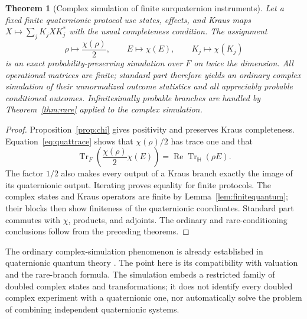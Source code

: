 \documentclass[11pt,oneside]{article}
\numberwithin{equation}{section}
\theoremstyle{plain}
\newtheorem{theorem}{Theorem}[section]
\theoremstyle{definition}
\theoremstyle{remark}
\newcommand{\HH}{\mathbb H}
\newcommand{\Tr}{\operatorname{Tr}}
\newcommand{\Rea}{\operatorname{Re}}
\begin{document}
\begin{theorem}[Complex simulation of finite surquaternion instruments]\label{thm:quatsimulation}
Let a fixed finite quaternionic protocol use states, effects, and Kraus maps
$X\mapsto\sum_jK_jXK_j^*$ with the usual completeness condition. The assignment
\begin{equation}\label{eq:quatsim}
 \rho\longmapsto\frac{\chi(\rho)}2,
 \qquad E\longmapsto\chi(E),
 \qquad K_j\longmapsto\chi(K_j)
\end{equation}
is an exact probability-preserving simulation over $F$ on twice the dimension. All operational matrices are finite; standard part therefore yields an ordinary complex simulation of their unnormalized outcome statistics and all appreciably probable conditioned outcomes. Infinitesimally probable branches are handled by Theorem~\ref{thm:rare} applied to the complex simulation.
\end{theorem}
\begin{proof}
Proposition~\ref{prop:chi} gives positivity and preserves Kraus completeness. Equation~\eqref{eq:quattrace} shows that $\chi(\rho)/2$ has trace one and that
\[
 \Tr_F\left(\frac{\chi(\rho)}2\chi(E)\right)
 =\Rea\Tr_{\HH}(\rho E).
\]
The factor $1/2$ also makes every output of a Kraus branch exactly the image of its quaternionic output. Iterating proves equality for finite protocols. The complex states and Kraus operators are finite by Lemma~\ref{lem:finitequantum}; their blocks then show finiteness of the quaternionic coordinates. Standard part commutes with $\chi$, products, and adjoints. The ordinary and rare-conditioning conclusions follow from the preceding theorems.
\end{proof}

The ordinary complex-simulation phenomenon is already established in quaternionic quantum theory \cite{Graydon}. The point here is its compatibility with valuation and the rare-branch formula. The simulation embeds a restricted family of doubled complex states and transformations; it does not identify every doubled complex experiment with a quaternionic one, nor automatically solve the problem of combining independent quaternionic systems.
\end{document}
